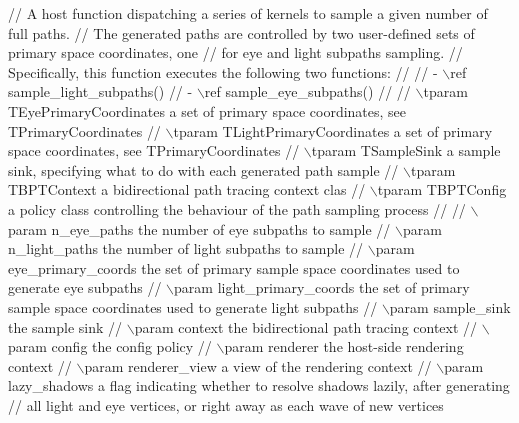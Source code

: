 \begin{DoxyCode}
\textcolor{comment}{// A host function dispatching a series of kernels to sample a given number of full paths.}
\textcolor{comment}{// The generated paths are controlled by two user-defined sets of primary space coordinates, one}
\textcolor{comment}{// for eye and light subpaths sampling.}
\textcolor{comment}{// Specifically, this function executes the following two functions:}
\textcolor{comment}{//}
\textcolor{comment}{// - \(\backslash\)ref sample\_light\_subpaths()}
\textcolor{comment}{// - \(\backslash\)ref sample\_eye\_subpaths()}
\textcolor{comment}{//}
\textcolor{comment}{// \(\backslash\)tparam TEyePrimaryCoordinates       a set of primary space coordinates, see TPrimaryCoordinates}
\textcolor{comment}{// \(\backslash\)tparam TLightPrimaryCoordinates     a set of primary space coordinates, see TPrimaryCoordinates}
\textcolor{comment}{// \(\backslash\)tparam TSampleSink                  a sample sink, specifying what to do with each generated path
       sample}
\textcolor{comment}{// \(\backslash\)tparam TBPTContext                  a bidirectional path tracing context clas}
\textcolor{comment}{// \(\backslash\)tparam TBPTConfig                   a policy class controlling the behaviour of the path sampling
       process}
\textcolor{comment}{//}
\textcolor{comment}{// \(\backslash\)param n\_eye\_paths               the number of eye subpaths to sample}
\textcolor{comment}{// \(\backslash\)param n\_light\_paths             the number of light subpaths to sample}
\textcolor{comment}{// \(\backslash\)param eye\_primary\_coords        the set of primary sample space coordinates used to generate eye
       subpaths}
\textcolor{comment}{// \(\backslash\)param light\_primary\_coords      the set of primary sample space coordinates used to generate light
       subpaths}
\textcolor{comment}{// \(\backslash\)param sample\_sink               the sample sink}
\textcolor{comment}{// \(\backslash\)param context                   the bidirectional path tracing context}
\textcolor{comment}{// \(\backslash\)param config                    the config policy}
\textcolor{comment}{// \(\backslash\)param renderer                  the host-side rendering context}
\textcolor{comment}{// \(\backslash\)param renderer\_view             a view of the rendering context}
\textcolor{comment}{// \(\backslash\)param lazy\_shadows              a flag indicating whether to resolve shadows lazily, after generating}
\textcolor{comment}{//                                  all light and eye vertices, or right away as each wave of new vertices
}
\end{DoxyCode}

